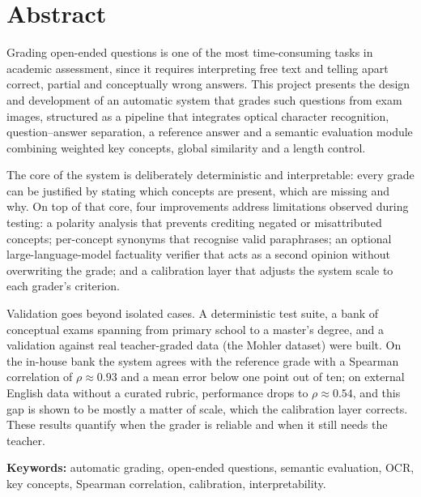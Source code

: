 \chapter*{Abstract}

Grading open-ended questions is one of the most time-consuming tasks in academic assessment, since it requires interpreting free text and telling apart correct, partial and conceptually wrong answers. This project presents the design and development of an automatic system that grades such questions from exam images, structured as a pipeline that integrates optical character recognition, question–answer separation, a reference answer and a semantic evaluation module combining weighted key concepts, global similarity and a length control.

The core of the system is deliberately deterministic and interpretable: every grade can be justified by stating which concepts are present, which are missing and why. On top of that core, four improvements address limitations observed during testing: a polarity analysis that prevents crediting negated or misattributed concepts; per-concept synonyms that recognise valid paraphrases; an optional large-language-model factuality verifier that acts as a second opinion without overwriting the grade; and a calibration layer that adjusts the system scale to each grader's criterion.

Validation goes beyond isolated cases. A deterministic test suite, a bank of conceptual exams spanning from primary school to a master's degree, and a validation against real teacher-graded data (the Mohler dataset) were built. On the in-house bank the system agrees with the reference grade with a Spearman correlation of $\rho \approx 0.93$ and a mean error below one point out of ten; on external English data without a curated rubric, performance drops to $\rho \approx 0.54$, and this gap is shown to be mostly a matter of scale, which the calibration layer corrects. These results quantify when the grader is reliable and when it still needs the teacher.

\vspace{0.8cm}
\noindent\textbf{Keywords:} automatic grading, open-ended questions, semantic evaluation, OCR, key concepts, Spearman correlation, calibration, interpretability.

\clearpage
